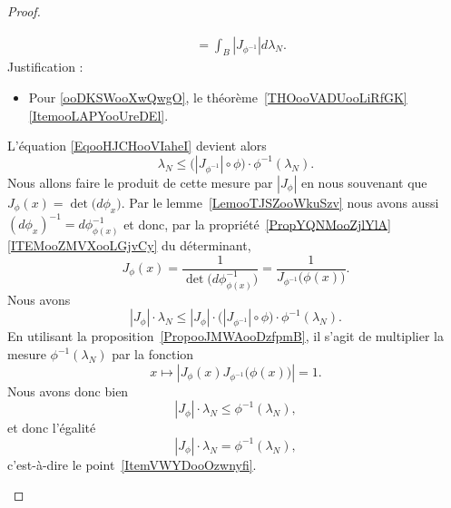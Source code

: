 \begin{proof}
\begin{enumerate}
\begin{subproof}
\begin{subequations}
\begin{align}
					                                                                       & =\int_B| J_{\phi^{-1}} |d\lambda_N.
				      \end{align}
			      \end{subequations}
			      Justification :
			      \begin{itemize}
				      \item Pour \eqref{ooDKSWooXwQwgO}, le théorème~\ref{THOooVADUooLiRfGK}\ref{ItemooLAPYooUreDEl}.
			      \end{itemize}

			      L'équation \eqref{EqooHJCHooVIaheI} devient alors
			      \begin{equation}
				      \lambda_N\leq \big( | J_{\phi^{-1}} |\circ\phi \big)\cdot \phi^{-1}(\lambda_N).
			      \end{equation}
			      Nous allons faire le produit de cette mesure par \( | J_{\phi} |\) en nous souvenant que \( J_{\phi}(x)=\det\big( d\phi_x \big)\). Par le lemme~\ref{LemooTJSZooWkuSzv} nous avons aussi \(   (d\phi_x)^{-1}=d\phi^{-1}_{\phi(x)} \) et donc, par la propriété~\ref{PropYQNMooZjlYlA}\ref{ITEMooZMVXooLGjvCy} du déterminant,
			      \begin{equation}
				      J_{\phi}(x)=\frac{1}{ \det\big( d\phi^{-1}_{\phi(x)} \big) }=\frac{1}{ J_{\phi^{-1}}\big( \phi(x) \big) }.
			      \end{equation}
			      Nous avons
			      \begin{equation}
				      | J_{\phi} |\cdot\lambda_N\leq | J_{\phi} |\cdot\big( | J_{\phi^{-1}} |\circ\phi \big)\cdot\phi^{-1}(\lambda_N).
			      \end{equation}
			      En utilisant la proposition~\ref{PropooJMWAooDzfpmB}, il s'agit de multiplier la mesure \( \phi^{-1}(\lambda_N)\) par la fonction
			      \begin{equation}
				      x\mapsto | J_{\phi}(x)J_{\phi^{-1}}\big( \phi(x) \big) |=1.
			      \end{equation}
			      Nous avons donc bien
			      \begin{equation}
				      | J_{\phi} |\cdot \lambda_N\leq \phi^{-1}(\lambda_N),
			      \end{equation}
			      et donc l'égalité
			      \begin{equation}
				      | J_{\phi} |\cdot\lambda_N=\phi^{-1}(\lambda_N),
			      \end{equation}
			      c'est-à-dire le point~\ref{ItemVWYDooOzwnyfi}.
		      \end{subproof}

\end{enumerate}
\end{proof}
